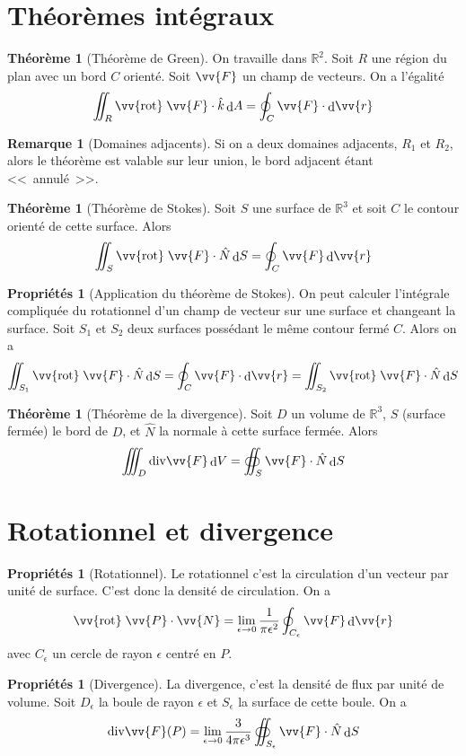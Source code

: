 \documentclass[11pt,a4paper]{article}
\theoremstyle{definition}
\newtheorem{myprop}[mydef]{Propriétés}
\newtheorem{myrem}[mydef]{Remarque}
\newtheorem{mytheo}[mydef]{Théorème}
\DeclareMathOperator{\diff}{d}
\newcommand{\dif}{\diff\!}
\renewcommand{\div}{\mathrm{div}}
\newcommand{\rot}{\vv{\mathrm{rot}}\;}
\newcommand{\R}{\mathbb{R}}
\begin{document}
\section{Théorèmes intégraux}

\begin{mytheo}[Théorème de Green]
	On travaille dans $\R^2$. Soit $R$ une région du plan avec un bord $C$ orienté. Soit $\vv{F}$ un champ de vecteurs. On a l'égalité
	\[ \iint_R \rot \vv{F} \cdot \hat{k} \dif A = \oint_C \vv{F} \cdot \dif \vv{r} \]
\end{mytheo}

\begin{myrem}[Domaines adjacents]
	Si on a deux domaines adjacents, $R_1$ et $R_2$, alors le théorème est valable sur leur union, le bord adjacent étant <<~annulé~>>.
\end{myrem}

\begin{mytheo}[Théorème de Stokes]
	Soit $S$ une surface de $\R^3$ et soit $C$ le contour orienté de cette surface. Alors
	\[ \iint_S \rot \vv{F} \cdot \hat{N} \dif S = \oint_C \vv{F} \dif \vv{r} \]
\end{mytheo}

\begin{myprop}[Application du théorème de Stokes]
	On peut calculer l'intégrale compliquée du rotationnel d'un champ de vecteur sur une surface et changeant la surface. Soit $S_1$ et $S_2$ deux surfaces possédant le même contour fermé $C$. Alors on a
	\[ \iint_{S_1} \rot \vv{F} \cdot \hat{N} \dif S = \oint_C \vv{F} \cdot \dif \vv{r} = \iint_{S_2} \rot \vv{F} \cdot \hat{N} \dif S \]
\end{myprop}

\begin{mytheo}[Théorème de la divergence]
	Soit $D$ un volume de $\R^3$, $S$ (surface fermée) le bord de $D$, et $\hat{N}$ la normale à cette surface fermée. Alors
	\[ \iiint_D \div \vv{F} \dif V = \oiint_S \vv{F} \cdot \hat{N} \dif S \]
\end{mytheo}

\section{Rotationnel et divergence}

\begin{myprop}[Rotationnel]
	Le rotationnel c'est la circulation d'un vecteur par unité de surface. C'est donc la densité de circulation. On a
	\[ \rot \vv{P} \cdot \vv{N} = \lim_{\epsilon \to 0} \frac 1{\pi \epsilon^2} \oint_{C_\epsilon} \vv{F} \dif \vv{r} \]
	avec $C_\epsilon$ un cercle de rayon $\epsilon$ centré en $P$.
\end{myprop}

\begin{myprop}[Divergence]
	La divergence, c'est la densité de flux par unité de volume. Soit $D_{\epsilon}$ la boule de rayon $\epsilon$ et $S_{\epsilon}$ la surface de cette boule. On a
	\[ \div \vv{F}(P) = \lim_{\epsilon \to 0} \frac{3}{4 \pi \epsilon^3} \oiint_{S_{\epsilon}} \vv{F} \cdot \hat{N} \dif S \]
\end{myprop}
\end{document}
